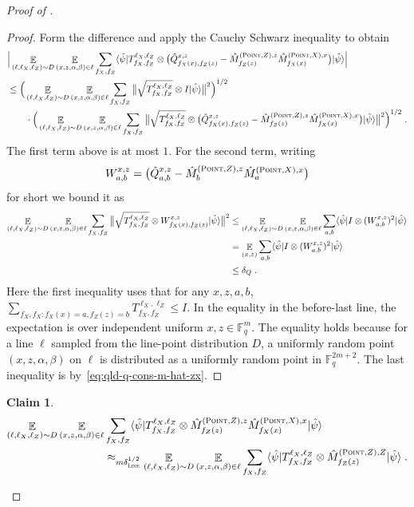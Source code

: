 \documentclass[11pt]{article}
\newtheorem{claim}[theorem]{Claim}
\theoremstyle{definition}
\newcommand{\ket}[1]{|#1\rangle}
\newcommand{\bra}[1]{\langle#1|}
\newcommand{\Id}{\ensuremath{I}}
\newcommand{\F}{\ensuremath{\mathbb{F}}}
\newcommand{\ot}{\otimes}
\newcommand{\E}{\mathop{\mathbb{E}}\displaylimits}
\newcommand{\typestyle}[1]{\ensuremath{\textsc{#1}}\xspace}
\renewcommand{\line}{\mathbf{\ell}}
\newcommand{\Point}{\typestyle{Point}}
\newcommand{\Line}{\typestyle{Line}}
\begin{document}
\begin{proof}[Proof of ]
\begin{proof}
Form the difference and apply the Cauchy Schwarz inequality to obtain
\begin{align*}
&\Big|  \E_{(\line, \line_X, \line_Z) \sim D} \E_{(x,z,\alpha, \beta) \in \line} \sum_{f_X, f_Z}\bra{\hat{\psi}} T^{\line_X, \line_Z}_{f_X, f_Z} \ot \big(\hat{Q}^{x, z }_{f_X(x),f_Z(z)}-\hat{M}^{(\Point,Z),z}_{f_Z(z)}\hat{M}^{(\Point,X),x}_{f_X(x)} \big) \ket{\hat{\psi}}\Big|\\
&\leq \Big( \E_{(\line, \line_X, \line_Z) \sim D} \E_{(x,z,\alpha, \beta) \in \line} \sum_{f_X, f_Z} \big\|\sqrt{T^{\line_X, \line_Z}_{f_X, f_Z} }\ot \Id \ket{\hat{\psi}} \big\|^2 \Big)^{1/2}\\
&\qquad\cdot \Big( \E_{(\line, \line_X, \line_Z) \sim D} \E_{(x,z,\alpha, \beta) \in \line} \sum_{f_X, f_Z}\big\| \sqrt{T^{\line_X, \line_Z}_{f_X, f_Z}} \ot \big(\hat{Q}^{x, z }_{f_X(x),f_Z(z)}-\hat{M}^{(\Point,Z),z}_{f_Z(z)}\hat{M}^{(\Point,X),x}_{f_X(x)} \big) \ket{\hat{\psi}}\big\|^2 \Big)^{1/2}\;.
\end{align*}
The first term above is at most $1$. For the second term, writing 
\[W^{x,z}_{a,b} = \big(\hat{Q}^{x, z }_{a,b}- \hat{M}^{(\Point,Z),z}_{b}\hat{M}^{(\Point,X),x}_{a}\big)\]
for short
we bound it as 
\begin{align*}
\E_{(\line, \line_X, \line_Z) \sim D} \E_{(x,z,\alpha, \beta) \in \line}  \sum_{f_X, f_Z}\big\| \sqrt{T^{\line_X, \line_Z}_{f_X, f_Z}} \ot W^{x,z}_{f_X(x),f_Z(z)} \ket{\hat{\psi}}\big\|^2 
&\leq \E_{(\line, \line_X, \line_Z) \sim D} \E_{(x,z,\alpha, \beta) \in \line} \sum_{a,b}\bra{\hat{\psi}} \Id \ot (W^{x,z}_{a,b})^2 \ket{\hat{\psi}} \\
&= \E_{(x,z)} \sum_{a,b}\bra{\hat{\psi}} \Id \ot (W^{x,z}_{a,b})^2 \ket{\hat{\psi}} \\
&\leq \delta_Q\;.
\end{align*}
Here the first inequality uses that for any $x,z,a,b$, $\sum_{f_X,f_X: f_X(x)=a,f_Z(z)=b} T^{\line_X, \line_Z}_{f_X, f_Z}\leq \Id$. 
In the equality in the before-last line, the expectation is over independent uniform $x,z\in \F_q^m$. The equality holds because for a line $\ell$ sampled from the line-point distribution $D$, a uniformly random point $(x,z,\alpha,\beta)$ on $\ell$ is distributed as a uniformly random point in $\F_q^{2m+2}$. The last inequality is by~\eqref{eq:qld-q-cons-m-hat-zx}.
\end{proof}

\begin{claim}\label{claim:17-2}
\begin{align}
  \E_{(\line, \line_X, \line_Z) \sim D} \E_{(x,z,\alpha, \beta) \in \line} &\sum_{f_X, f_Z} \bra{\hat{\psi}} T^{\line_X, \line_Z}_{f_X, f_Z} \ot \hat{M}^{(\Point,Z),z}_{f_Z(z)}  \hat{M}^{(\Point,X),x}_{f_X(x)} \ket{\hat{\psi}}  \notag\\
       &\approx_{m\delta_\Line^{1/2}} \E_{(\line, \line_X, \line_Z) \sim D}  \E_{(x,z,\alpha, \beta) \in \line} \sum_{f_X,f_Z} \bra{\hat{\psi}} T^{\line_X, \line_Z}_{f_X, f_Z} \ot  \hat{M}^{(\Point,Z),Z}_{f_Z(z)} \ket{\hat{\psi}}\;. 
\end{align}
\end{claim}


\end{proof}
\end{document}
